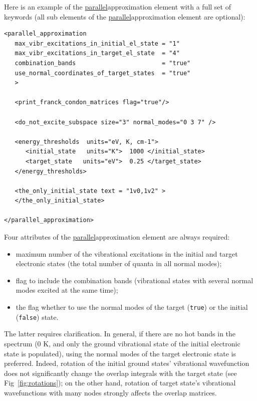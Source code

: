 \documentclass[11pt]{article}
\begin{document}
Here is an example of the \ul{parallel}{approximation} element with a full
set of keywords (all sub elements of the \ul{parallel}{approximation} element are optional):
\begin{lstlisting}[frame=single,framerule=0pt]
<parallel_approximation
   max_vibr_excitations_in_initial_el_state = "1"
   max_vibr_excitations_in_target_el_state  = "4"
   combination_bands                        = "true"
   use_normal_coordinates_of_target_states  = "true"
   >

   <print_franck_condon_matrices flag="true"/>

   <do_not_excite_subspace size="3" normal_modes="0 3 7" />

   <energy_thresholds  units="eV, K, cm-1">
      <initial_state   units="K">  1000 </initial_state>
      <target_state   units="eV">  0.25 </target_state>
   </energy_thresholds>

   <the_only_initial_state text = "1v0,1v2" >
   </the_only_initial_state>

</parallel_approximation>
\end{lstlisting}
Four attributes of the \ul{parallel}{approximation} element are always required:
\begin{itemize}
\item maximum number of the vibrational excitations in the initial and target electronic states
(the total number of quanta in all normal modes);
\item flag to include the combination bands (vibrational states with several normal modes excited at the same time);
\item the flag whether to use the normal modes of the target ({\tt true}) or the initial ({\tt false}) state.
\end{itemize}
The latter requires clarification. In general, if there are no hot bands in the spectrum 
(0 K, and only the ground vibrational state of the initial electronic state is populated),
using the normal modes of the target electronic state is preferred. 
Indeed, rotation of
the initial ground states' vibrational wavefunction does not significantly change the overlap integrals with
the target state (see Fig~\ref{fig:rotations}); on the other hand, rotation of target state's vibrational wavefunctions with many 
nodes strongly affects the overlap matrices.
\end{document}
